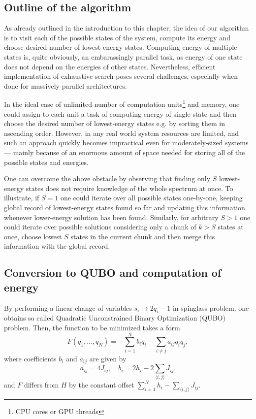 \subsection{Outline of the algorithm}
As already outlined in the introduction to this chapter, the idea of our algorithm is to visit each of the possible states of the system, compute its energy and choose desired number of lowest-energy states. Computing energy of multiple states is, quite obviously, an embarassingly parallel task, as energy of one state does not depend on the energies of other states.
Nevertheless, efficient implementation of exhaustive search poses several challenges, especially when done for massively parallel architectures.

In the ideal case of unlimited number of computation units\footnote{CPU cores or GPU threads} and memory, one could assign to each unit a task of computing energy of single state and then choose the desired number of lowest-energy states e.g. by sorting them in ascending order. However, in any real world system resources are limited, and such an approach quickly becomes impractical even for moderately-sized systems --- mainly because of an enormous amount of space needed for storing all of the possible states and energies.

One can overcome the above obstacle by observing that finding only $S$ lowest-energy states does not require knowledge of the whole spectrum at once.
To illustrate, if $S=1$ one could iterate over all possible states one-by-one, keeping global record of lowest-energy states found so far and updating this information whenever lower-energy solution has been found. Similarly, for arbitrary $S > 1$ one could iterate over possible solutions considering only a chunk of $k > S$ states at once, choose lowest $S$ states in the current chunk and then merge this information with the global record.


\subsection{Conversion to QUBO and computation of energy}
By performing a linear change of variables $s_i \mapsto 2q_i-1$ in spinglass problem, one obtains so called Quadratic Unconstrained Binary Optimization (QUBO) problem. Then, the function to be minimized takes a form
\begin{equation}
\label{eq:qubo}
    F(q_1, \ldots, q_N) = -\sum_{i=1}^N b_iq_i - \sum_{i \ne j} a_{ij} q_i q_j,
\end{equation}
where coefficients $b_i$ and $a_{ij}$ are given by
\begin{equation}
\label{eq:toQUBO}
a_{ij}= 4J_{ij},
\quad 
b_i= 2h_i - 2 \sum_{\langle i, j \rangle} J_{ij}.
\end{equation}
and $F$ differs from $H$ by the constant offset $\sum_{i=1}^N h_i - \sum_{\langle i, j \rangle} J_{ij}$.

